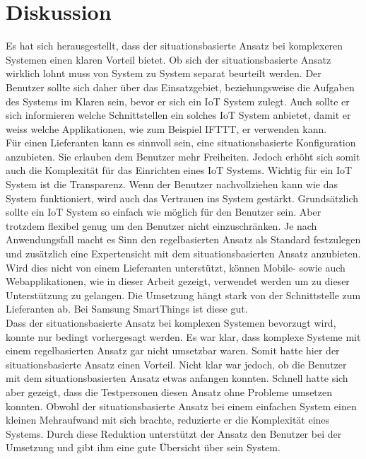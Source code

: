 \section{Diskussion}
Es hat sich herausgestellt, dass der situationsbasierte Ansatz bei komplexeren Systemen einen klaren Vorteil bietet. Ob sich der situationsbasierte Ansatz wirklich lohnt muss von System zu System separat beurteilt werden. Der Benutzer sollte sich daher über das Einsatzgebiet, beziehungsweise die Aufgaben des Systems im Klaren sein, bevor er sich ein IoT System zulegt. Auch sollte er sich informieren welche Schnittstellen ein solches IoT System anbietet, damit er weiss welche Applikationen, wie zum Beispiel IFTTT, er verwenden kann.\\
Für einen Lieferanten kann es sinnvoll sein, eine situationsbasierte Konfiguration anzubieten. Sie erlauben dem Benutzer mehr Freiheiten. Jedoch erhöht sich somit auch die Komplexität für das Einrichten eines IoT Systems. Wichtig für ein IoT System ist die Transparenz. Wenn der Benutzer nachvollziehen kann wie das System funktioniert, wird auch das Vertrauen ins System gestärkt. Grundsätzlich sollte ein IoT System so einfach wie möglich für den Benutzer sein. Aber trotzdem flexibel genug um den Benutzer nicht einzuschränken. Je nach Anwendungsfall macht es Sinn den regelbasierten Ansatz als Standard festzulegen und zusätzlich eine Expertensicht mit dem situationsbasierten Ansatz anzubieten. Wird dies nicht von einem Lieferanten unterstützt, können Mobile- sowie auch Webapplikationen, wie in dieser Arbeit gezeigt, verwendet werden um zu dieser Unterstützung zu gelangen. Die Umsetzung hängt stark von der Schnittstelle zum Lieferanten ab. Bei Samsung SmartThings ist diese gut.\\[2ex]
%
Dass der situationsbasierte Ansatz bei komplexen Systemen bevorzugt wird, konnte nur bedingt vorhergesagt werden. Es war klar, dass komplexe Systeme mit einem regelbasierten Ansatz gar nicht umsetzbar waren. Somit hatte hier der situationsbasierte Ansatz einen Vorteil. Nicht klar war jedoch, ob die Benutzer mit dem situationsbasierten Ansatz etwas anfangen konnten. Schnell hatte sich aber gezeigt, dass die Testpersonen diesen Ansatz ohne Probleme umsetzen konnten. Obwohl der situationsbasierte Ansatz bei einem einfachen System einen kleinen Mehraufwand mit sich brachte, reduzierte er die Komplexität eines Systems. Durch diese Reduktion unterstützt der Ansatz den Benutzer bei der Umsetzung und gibt ihm eine gute Übersicht über sein System.\\
